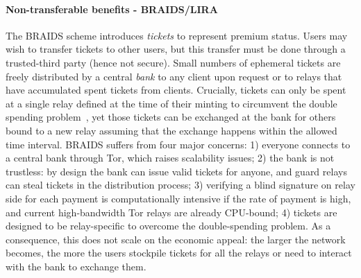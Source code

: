 

\paragraph*{Non-transferable benefits - BRAIDS/LIRA} The BRAIDS scheme introduces \emph{tickets} to represent
premium status. Users may wish to transfer tickets to other users, but this transfer must be done through a trusted-third party (hence not secure).  Small numbers of ephemeral tickets are freely distributed by a
central \emph{bank} to any client upon request or to relays that have
accumulated spent tickets from clients. Crucially, tickets can only be spent at
a single relay defined at the time of their minting to circumvent the double
spending problem~\cite{jansen2010recruiting}, yet those tickets can be exchanged at the bank for others bound to a new relay assuming that the exchange happens within the allowed time interval. BRAIDS suffers from four major concerns: 1) everyone connects to a central bank through Tor, which raises scalability issues; 2) the bank is not trustless: by design the bank can issue valid tickets for anyone, and guard relays can steal tickets in the distribution process; 3) verifying a blind signature on relay side for each payment is computationally intensive if the rate of payment is high, and current high-bandwidth Tor relays are already CPU-bound; 4) tickets are designed to be relay-specific to overcome the double-spending problem. As a consequence, this does not scale on the economic appeal: the larger the network becomes, the more the users stockpile tickets for all the relays or need to interact with the bank to exchange them.


